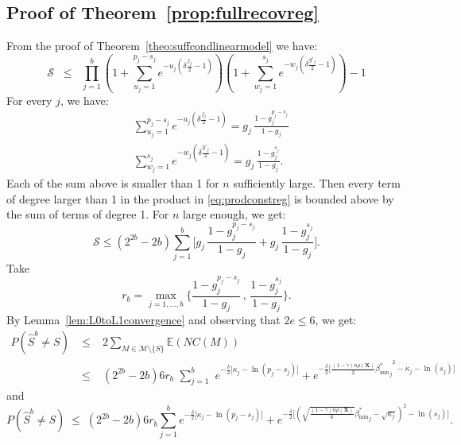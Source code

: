 \documentclass[aos]{imsart}
\theoremstyle{plain}
\newcommand{\E}{\mathbb{E}}
\newcommand{\M}{\mathcal{M}}
\newcommand{\bs}{\boldsymbol}
\begin{document}
 \subsection{Proof of Theorem~\ref{prop:fullrecovreg}}
From the proof of Theorem~\ref{theo:suffcondlinearmodel} we have:
\begin{equation}\label{eq:prodconstreg}
    \mathcal{S} \;\;\leq\;\; \prod_{j=1}^b\left(1+\sum_{u_j=1}^{p_j-s_j}e^{-u_j\left(\delta \tfrac{f_j}{2}-1\right)}\right)\left(1+
    \sum_{w_j=1}^{s_j}    e^{-w_j\left(\delta \tfrac{g'_j}{2}-1\right)}\right) - 1
\end{equation}
For every $j$, we have:
\begin{eqnarray*}
    &\sum_{u_j=1}^{p_j-s_j}e^{-u_j\left(\delta \tfrac{f_j}{2}-1\right)}
    =g_j\,\frac{1-g_j^{p_j-s_j}}{1-g_j} \\
    &\sum_{w_j=1}^{s_j}    e^{-w_j\left(\delta \tfrac{g'_j}{2}-1\right)} =g_j\,\frac{1-g_j^{s_j}}{1-g_j}.
\end{eqnarray*}
Each of the sum above is smaller than 1 for $n$ sufficiently large. Then every term of degree larger than 1 in the product in \eqref{eq:prodconstreg} is bounded above by the sum of terms of degree 1. For $n$ large enough, we get: 
 \begin{equation*} \mathcal{S} \leq (2^{2b}-2b)\sum_{j=1}^b \bigg[g_j\,\frac{1-g_j^{p_j-s_j}}{1-g_j}+ g_j\,\frac{1-g_j^{s_j}}{1-g_j}\bigg ]. \end{equation*} 
 Take $$r_b=\max_{j=1,\ldots,b}\bigg\{\frac{1-g_j^{p_j-s_j}}{1-g_j} \,,\,\frac{1-g_j^{s_j}}{1-g_j} \bigg\}.$$
 By Lemma~\ref{lem:L0toL1convergence} and observing that $2e \leq 6$, we get: 
 \begin{eqnarray*}
     P(\hat{S}^{b} \neq S)\;&\leq&\;  2 \sum_{M \in \M\setminus \{S\}} \E\left(NC(M)\right) \\\;&\leq&\; (2^{2b}-2b)6r_b\,\,\sum_{j=1}^b\,\, e^{-\tfrac{\delta}{2}\big[\kappa_j-\ln(p_j-s_j)\big]} + e^{-\tfrac{\delta}{2}\big[\frac{(1-\gamma) n\rho(\bs X)}{2}{{\beta_{\min}^*}_j}^2 - \kappa_j -\ln(s_j) \big]}
 \end{eqnarray*}
and 
 $$ P(\hat{S}^{b} \neq S)\;\leq \;(2^{2b}-2b)6r_b\sum_{j=1}^b e^{-\tfrac{\delta}{2}\big[\kappa_j-\ln(p_j-s_j)\big]} + e^{-\tfrac{\delta}{2}\big[(\sqrt{\frac{(1-\gamma) n\rho(\bs X)}{6}}{{\beta_{\min}^*}_j} - \sqrt{\kappa_j})^2 -\ln(s_j) \big]}.$$
\end{document}
